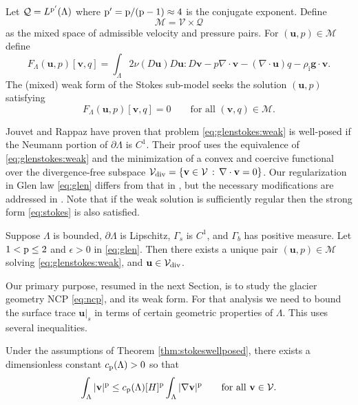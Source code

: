 \documentclass[hidelinks,onefignum,onetabnum,final]{siamart220329}  %
\newcommand{\eps}{\epsilon}
\newcommand{\grad}{\nabla}
\newcommand{\Div}{\nabla\cdot}
\newcommand{\bg}{\mathbf{g}}
\newcommand{\bu}{\mathbf{u}}
\newcommand{\bv}{\mathbf{v}}
\newcommand{\cQ}{\mathcal{Q}}
\newcommand{\cV}{\mathcal{V}}
\newcommand{\pp}{{\text{\textnormal{p}}}}
\newcommand{\rhoi}{\rho_{\text{i}}}
\newcommand{\Vdiv}{\cV_{\text{\textnormal{div}}}}
\begin{document}
Let $\cQ=L^{\pp'}(\Lambda)$ where $\pp'=\pp/(\pp-1)\approx 4$ is the conjugate exponent.  Define
\begin{equation}
\mathcal{M} = \cV \times \cQ \label{eq:glenstokes:mixedspace}
\end{equation}
as the mixed space of admissible velocity and pressure pairs.  For $(\bu,p) \in \mathcal{M}$ define
\begin{equation}
F_\Lambda(\bu,p)[\bv,q] = \int_\Lambda 2 \nu(D\bu) D\bu : D\bv - p \Div\bv - (\Div\bu) q - \rhoi \bg \cdot \bv. \label{eq:glenstokes:fcnl}
\end{equation}
The (mixed) weak form of the Stokes sub-model seeks the solution $(\bu,p)$ satisfying
\begin{equation}
F_\Lambda(\bu,p)[\bv,q] = 0 \qquad \text{for all } (\bv,q) \in \mathcal{M}. \label{eq:glenstokes:weak}
\end{equation}

Jouvet and Rappaz \cite{JouvetRappaz2011} have proven that problem \eqref{eq:glenstokes:weak} is well-posed if the Neumann portion of $\partial\Lambda$ is $C^1$.  Their proof uses the equivalence of \eqref{eq:glenstokes:weak} and the minimization of a convex and coercive functional over the divergence-free subspace $\Vdiv = \{\bv\in\cV\,:\,\Div\bv=0\}$.  Our regularization in Glen law \eqref{eq:glen} differs from that in \cite{JouvetRappaz2011}, but the necessary modifications are addressed in \cite{IsaacStadlerGhattas2015}.  Note that if the weak solution is sufficiently regular then the strong form \eqref{eq:stokes} is also satisfied.

\begin{theorem} \label{thm:stokeswellposed}  Suppose $\Lambda$ is bounded, $\partial\Lambda$ is Lipschitz, $\Gamma_s$ is $C^1$, and $\Gamma_b$ has positive measure.  Let $1<\pp\le 2$ and $\eps>0$ in \eqref{eq:glen}.  Then there exists a unique pair $(\bu,p) \in \mathcal{M}$ solving \eqref{eq:glenstokes:weak}, and $\bu\in \Vdiv$.
\end{theorem}

Our primary purpose, resumed in the next Section, is to study the glacier geometry NCP \eqref{eq:ncp}, and its weak form.  For that analysis we need to bound the surface trace $\bu|_s$ in terms of certain geometric properties of $\Lambda$.  This uses several inequalities.

\begin{lemma} \label{lem:poincare}
Under the assumptions of Theorem \ref{thm:stokeswellposed}, there exists a dimensionless constant $c_{\pp}(\Lambda)>0$ so that
\begin{equation}
\int_\Lambda |\bv|^\pp \le c_{\pp}(\Lambda) [H]^\pp \int_\Lambda |\grad\bv|^\pp \qquad \text{for all } \bv \in \cV. \label{eq:poincare}
\end{equation}
\end{lemma}
\end{document}
